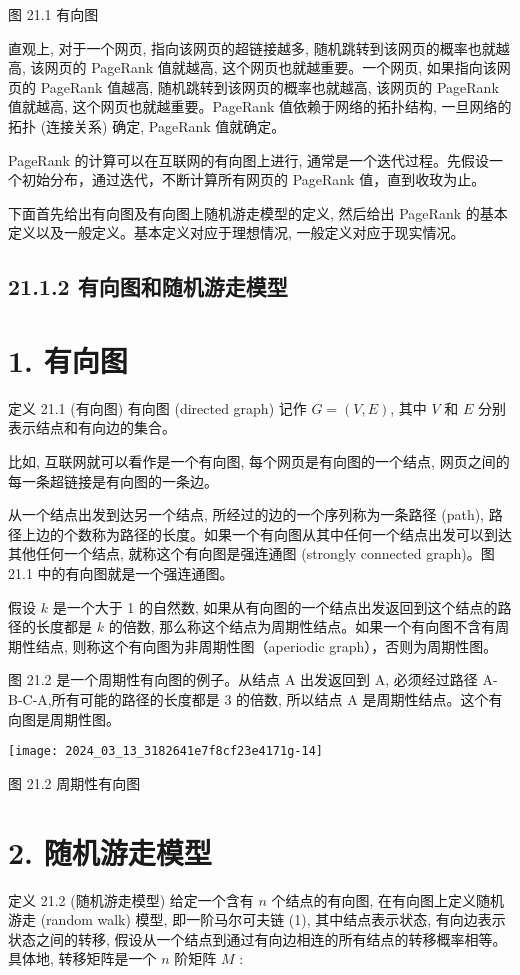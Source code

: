 \documentclass[10pt]{article}
\begin{document}
\begin{CJK*}{UTF8}{bsmi}
图 21.1 有向图

直观上, 对于一个网页, 指向该网页的超链接越多, 随机跳转到该网页的概率也就越高, 该网页的 PageRank 值就越高, 这个网页也就越重要。一个网页, 如果指向该网页的 PageRank 值越高, 随机跳转到该网页的概率也就越高, 该网页的 PageRank 值就越高, 这个网页也就越重要。PageRank 值依赖于网络的拓扑结构, 一旦网络的拓扑 (连接关系) 确定, PageRank 值就确定。

PageRank 的计算可以在互联网的有向图上进行, 通常是一个迭代过程。先假设一个初始分布，通过迭代，不断计算所有网页的 PageRank 值，直到收玫为止。

下面首先给出有向图及有向图上随机游走模型的定义, 然后给出 PageRank 的基本定义以及一般定义。基本定义对应于理想情况, 一般定义对应于现实情况。

\subsection*{21.1.2 有向图和随机游走模型}
\section*{1. 有向图}
定义 21.1 (有向图) 有向图 (directed graph) 记作 $G=(V, E)$, 其中 $V$ 和 $E$ 分别表示结点和有向边的集合。

比如, 互联网就可以看作是一个有向图, 每个网页是有向图的一个结点, 网页之间的每一条超链接是有向图的一条边。

从一个结点出发到达另一个结点, 所经过的边的一个序列称为一条路径 (path), 路径上边的个数称为路径的长度。如果一个有向图从其中任何一个结点出发可以到达其他任何一个结点, 就称这个有向图是强连通图 (strongly connected graph)。图 21.1 中的有向图就是一个强连通图。

假设 $k$ 是一个大于 1 的自然数, 如果从有向图的一个结点出发返回到这个结点的路径的长度都是 $k$ 的倍数, 那么称这个结点为周期性结点。如果一个有向图不含有周期性结点, 则称这个有向图为非周期性图（aperiodic graph），否则为周期性图。

图 21.2 是一个周期性有向图的例子。从结点 A 出发返回到 A, 必须经过路径 A-B-C-A,所有可能的路径的长度都是 3 的倍数, 所以结点 $\mathrm{A}$ 是周期性结点。这个有向图是周期性图。

\begin{center}
\texttt{[image: 2024\_03\_13\_3182641e7f8cf23e4171g-14]}
\end{center}

图 21.2 周期性有向图

\section*{2. 随机游走模型}
定义 21.2 (随机游走模型) 给定一个含有 $n$ 个结点的有向图, 在有向图上定义随机游走 (random walk) 模型, 即一阶马尔可夫链 (1), 其中结点表示状态, 有向边表示状态之间的转移, 假设从一个结点到通过有向边相连的所有结点的转移概率相等。具体地, 转移矩阵是一个 $n$ 阶矩阵 $M$ :



\end{CJK*}
\end{document}
